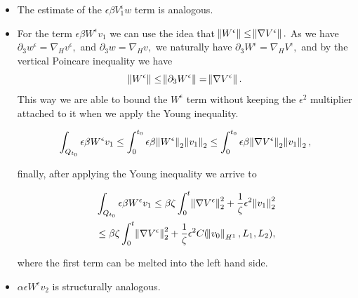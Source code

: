 \documentclass[11pt]{article}
\begin{document}
\begin{enumerate}
\begin{itemize}
      Here $\zeta$ is the constant of the Young inequality, and it only has to be small enough to keep the coefficient of $\norm{\nabla V_\epsilon}$ positive.
      
      \item The estimate of the $\epsilon \beta V^\epsilon_1 w$ term is analogous.
      
      \item For the term $\epsilon \beta W^\epsilon v_1$ we can use the idea that $\norm{W^\epsilon} \leq \norm{\nabla V^\epsilon}.$ As we have $\partial_3 w^\epsilon = \nabla_H v^\epsilon,$ and $\partial_3 w = \nabla_H v,$ we naturally have $\partial_3 W^\epsilon = \nabla_H V^\epsilon,$ and by the vertical Poincare inequality we have $$\norm{W^\epsilon} \leq \norm{\partial_3 W^\epsilon} = \norm{\nabla V^\epsilon}.$$ This way we are able to bound the $W^\epsilon$ term without keeping the $\epsilon^2$ multiplier attached to it when we apply the Young inequality.
      
      $$ \int_{Q_{t_0}} \epsilon \beta W^\epsilon v_1 \leq \int_0^{t_0} \epsilon \beta \norm{W^\epsilon}_2 \norm{v_1}_2 \leq \int_0^{t_0} \epsilon \beta \norm{\nabla V^\epsilon}_2 \norm{v_1}_2, $$
      
      finally, after applying the Young inequality we arrive to
      
      \begin{equation}
        \begin{split}
          & \int_{Q_{t_0}} \epsilon \beta W^\epsilon v_1 \leq \beta \zeta \int_0^t \norm{\nabla V^\epsilon}_2^2 + \frac{1}{\zeta} \epsilon^2 \norm{v_1}_2^2 \\
          & \leq \beta \zeta \int_0^t \norm{\nabla V^\epsilon}_2^2 + \frac{1}{\zeta} \epsilon^2 C(\norm{v_0}_{H^1}, L_1, L_2),
        \end{split}
      \end{equation}
      
      where the first term can be melted into the left hand side.
            
      \item $\alpha \epsilon W^\epsilon v_2$ is structurally analogous.
      
    
    \end{itemize}

\end{enumerate}

\nocite{*}


\end{document}
